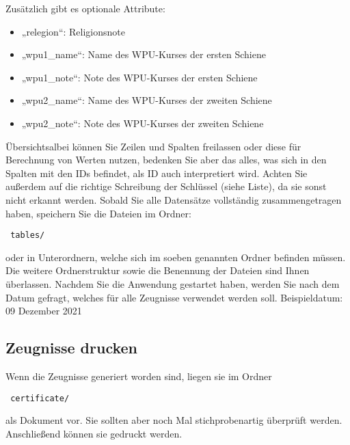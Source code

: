 \documentclass[a4paper,10pt]{scrartcl}
\begin{document}
      Zusätzlich gibt es optionale Attribute:
      \begin{itemize}
         \item „relegion“: Religionsnote
         \item „wpu1\_name“: Name des WPU-Kurses der ersten Schiene
         \item „wpu1\_note“: Note des WPU-Kurses der ersten Schiene
	 \item „wpu2\_name“: Name des WPU-Kurses der zweiten Schiene
         \item „wpu2\_note“: Note des WPU-Kurses der zweiten Schiene
      \end{itemize}
      Übersichtsalbei können Sie Zeilen und Spalten freilassen oder diese für Berechnung von Werten nutzen, bedenken Sie aber das alles, was sich in den Spalten mit den IDs befindet, als ID auch interpretiert wird.\newline
      Achten Sie außerdem auf die richtige Schreibung der Schlüssel (siehe Liste), da sie sonst nicht erkannt werden. \newline
      Sobald Sie alle Datensätze vollständig zusammengetragen haben, speichern Sie die Dateien im Ordner:
      \begin{verbatim} tables/  \end{verbatim} 
      oder in Unterordnern, welche sich im soeben genannten Ordner befinden müssen. Die weitere Ordnerstruktur sowie die Benennung der Dateien sind Ihnen überlassen. \newline
      Nachdem Sie die Anwendung gestartet haben, werden Sie nach dem Datum gefragt, welches für alle Zeugnisse verwendet werden soll. Beispieldatum: 09 Dezember 2021 
      \subsection{Zeugnisse drucken}
      Wenn die Zeugnisse generiert worden sind, liegen sie im Ordner
      \begin{verbatim} certificate/  \end{verbatim}
      als Dokument vor. Sie sollten aber noch Mal stichprobenartig überprüft werden. Anschließend können sie gedruckt werden.
\end{document}
